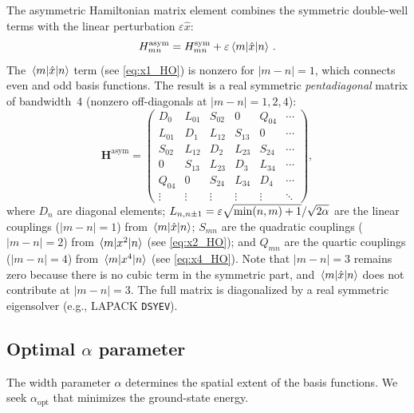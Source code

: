 The asymmetric Hamiltonian matrix element combines the symmetric double-well terms with
the linear perturbation $\varepsilon\hat{x}$:
\begin{equation}\label{eq:H_asym}
  H_{mn}^{\text{asym}} = H_{mn}^{\text{sym}} + \varepsilon\mel{m}{\hat{x}}{n}\,.
\end{equation}
The $\mel{m}{\hat{x}}{n}$ term (see \cref{eq:x1_HO}) is nonzero for $|m-n|=1$, which
connects even and odd basis functions. The result is a real symmetric \emph{pentadiagonal}
matrix of bandwidth~4 (nonzero off-diagonals at $|m-n|=1,2,4$):
\begin{equation}
  \mathbf{H}^{\text{asym}} =
  \begin{pmatrix}
    D_0    & L_{01} & S_{02} & 0      & Q_{04} & \cdots \\
    L_{01} & D_1    & L_{12} & S_{13} & 0      & \cdots \\
    S_{02} & L_{12} & D_2    & L_{23} & S_{24} & \cdots \\
    0      & S_{13} & L_{23} & D_3    & L_{34} & \cdots \\
    Q_{04} & 0      & S_{24} & L_{34} & D_4    & \cdots \\
    \vdots & \vdots & \vdots & \vdots & \vdots & \ddots
  \end{pmatrix},
\end{equation}
where $D_n$ are diagonal elements; $L_{n,n\pm1} = \varepsilon\sqrt{\min(n,m)+1}/\sqrt{2\alpha}$
are the linear couplings ($|m-n|=1$) from $\mel{m}{\hat{x}}{n}$; $S_{mn}$ are the
quadratic couplings ($|m-n|=2$) from $\mel{m}{x^2}{n}$ (see \cref{eq:x2_HO}); and
$Q_{mn}$ are the quartic couplings ($|m-n|=4$) from $\mel{m}{x^4}{n}$ (see
\cref{eq:x4_HO}). Note that $|m-n|=3$ remains zero because there is no cubic term
in the symmetric part, and $\mel{m}{\hat{x}}{n}$ does not contribute at $|m-n|=3$.
The full matrix is diagonalized by a real symmetric eigensolver (e.g., LAPACK
\texttt{DSYEV}).

\subsection{Optimal $\alpha$ parameter}\label{sec:alpha_opt}

The width parameter $\alpha$ determines the spatial extent of the basis functions.
We seek $\alpha_{\text{opt}}$ that minimizes the ground-state energy.

